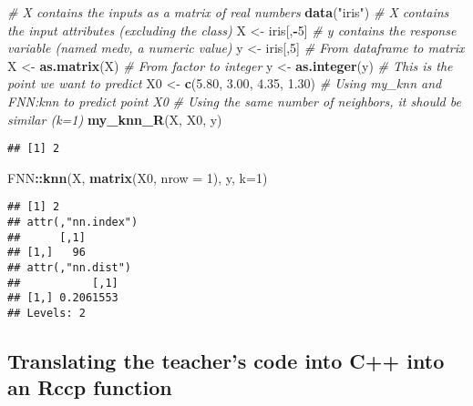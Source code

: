 \documentclass[]{article}
\newenvironment{Shaded}{\begin{snugshade}}{\end{snugshade}}
\newcommand{\CommentTok}[1]{\textcolor[rgb]{0.56,0.35,0.01}{\textit{#1}}}
\newcommand{\DataTypeTok}[1]{\textcolor[rgb]{0.13,0.29,0.53}{#1}}
\newcommand{\DecValTok}[1]{\textcolor[rgb]{0.00,0.00,0.81}{#1}}
\newcommand{\FloatTok}[1]{\textcolor[rgb]{0.00,0.00,0.81}{#1}}
\newcommand{\KeywordTok}[1]{\textcolor[rgb]{0.13,0.29,0.53}{\textbf{#1}}}
\newcommand{\NormalTok}[1]{#1}
\newcommand{\OperatorTok}[1]{\textcolor[rgb]{0.81,0.36,0.00}{\textbf{#1}}}
\newcommand{\StringTok}[1]{\textcolor[rgb]{0.31,0.60,0.02}{#1}}
\begin{document}
\begin{Shaded}
\begin{Highlighting}[]
\CommentTok{# X contains the inputs as a matrix of real numbers}
\KeywordTok{data}\NormalTok{(}\StringTok{"iris"}\NormalTok{)}
\CommentTok{# X contains the input attributes (excluding the class)}
\NormalTok{X <-}\StringTok{ }\NormalTok{iris[,}\OperatorTok{-}\DecValTok{5}\NormalTok{]}
\CommentTok{# y contains the response variable (named medv, a numeric value)}
\NormalTok{y <-}\StringTok{ }\NormalTok{iris[,}\DecValTok{5}\NormalTok{]}
\CommentTok{# From dataframe to matrix}
\NormalTok{X <-}\StringTok{ }\KeywordTok{as.matrix}\NormalTok{(X)}
\CommentTok{# From factor to integer}
\NormalTok{y <-}\StringTok{ }\KeywordTok{as.integer}\NormalTok{(y)}
\CommentTok{# This is the point we want to predict}
\NormalTok{X0 <-}\StringTok{ }\KeywordTok{c}\NormalTok{(}\FloatTok{5.80}\NormalTok{, }\FloatTok{3.00}\NormalTok{, }\FloatTok{4.35}\NormalTok{, }\FloatTok{1.30}\NormalTok{)}
\CommentTok{# Using my_knn and FNN:knn to predict point X0}
\CommentTok{# Using the same number of neighbors, it should be similar (k=1)}
\KeywordTok{my_knn_R}\NormalTok{(X, X0, y)}
\end{Highlighting}
\end{Shaded}

\begin{verbatim}
## [1] 2
\end{verbatim}

\begin{Shaded}
\begin{Highlighting}[]
\NormalTok{FNN}\OperatorTok{::}\KeywordTok{knn}\NormalTok{(X, }\KeywordTok{matrix}\NormalTok{(X0, }\DataTypeTok{nrow =} \DecValTok{1}\NormalTok{), y, }\DataTypeTok{k=}\DecValTok{1}\NormalTok{)}
\end{Highlighting}
\end{Shaded}

\begin{verbatim}
## [1] 2
## attr(,"nn.index")
##      [,1]
## [1,]   96
## attr(,"nn.dist")
##           [,1]
## [1,] 0.2061553
## Levels: 2
\end{verbatim}

\newpage

\hypertarget{translating-the-teachers-code-into-c-into-an-rccp-function}{%
\subsection{Translating the teacher's code into C++ into an Rccp
function}\label{translating-the-teachers-code-into-c-into-an-rccp-function}}
\end{document}
